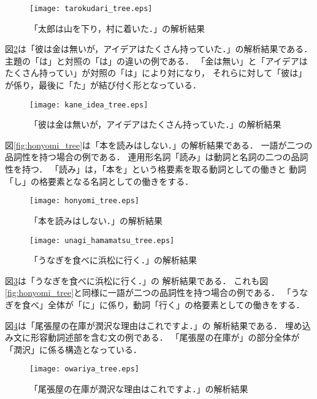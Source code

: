 \documentclass[japanese]{jnlp_1.2}
\begin{document}
\begin{figure}[t]
  \centering
      \texttt{[image: tarokudari\_tree.eps]}
  \caption{「太郎は山を下り，村に着いた．」の解析結果}
\vspace{2\baselineskip}
  \label{fig:tarokudari_tree}
\end{figure}


図\ref{fig:kane_idea_tree}は「彼は金は無いが，アイデアはたくさん持っていた．」の解析結果である．
主題の「は」と対照の「は」の違いの例である．
「金は無い」と「アイデアはたくさん持ってい」が対照の「は」により対になり，
それらに対して「彼は」が係り，最後に「た」が結び付く形となっている．

\begin{figure}[t]
  \centering
      \texttt{[image: kane\_idea\_tree.eps]}
  \caption{「彼は金は無いが，アイデアはたくさん持っていた．」の解析結果}
  \label{fig:kane_idea_tree}
\end{figure}


図\ref{fig:honyomi_tree}は「本を読みはしない．」の解析結果である．
一語が二つの品詞性を持つ場合の例である．
連用形名詞「読み」は動詞と名詞の二つの品詞性を持つ．
「読み」は，「本を」という格要素を取る動詞としての働きと
動詞「し」の格要素となる名詞としての働きをする．

\begin{figure}[p]
  \centering
      \texttt{[image: honyomi\_tree.eps]}
  \caption{「本を読みはしない．」の解析結果}\label{fig:honyomi_tree}
    \par\vspace{18pt}
      \texttt{[image: unagi\_hamamatsu\_tree.eps]}
  \caption{「うなぎを食べに浜松に行く．」の解析結果}
  \label{fig:unagi_hamamatsu_tree}
\end{figure}



図\ref{fig:unagi_hamamatsu_tree}は「うなぎを食べに浜松に行く．」の
解析結果である．
これも図\ref{fig:honyomi_tree}と同様に一語が二つの品詞性を持つ場合の例である．
「うなぎを食べ」全体が「に」に係り，動詞「行く」の格要素としての働きをする．


図\ref{fig:owariya_tree}は「尾張屋の在庫が潤沢な理由はこれですよ．」の
解析結果である．
埋め込み文に形容動詞述部を含む文の例である．
「尾張屋の在庫が」の部分全体が「潤沢」に係る構造となっている．

\begin{figure}[b]
\vspace{1\baselineskip}
  \centering
      \texttt{[image: owariya\_tree.eps]}
  \caption{「尾張屋の在庫が潤沢な理由はこれですよ．」の解析結果}
  \label{fig:owariya_tree}
\end{figure}
\end{document}
